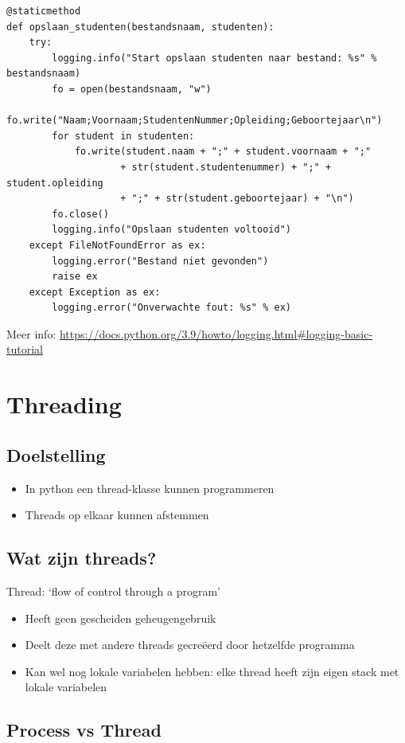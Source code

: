 \documentclass{article}
\begin{document}
\begin{verbatim}
@staticmethod
def opslaan_studenten(bestandsnaam, studenten):
    try:
        logging.info("Start opslaan studenten naar bestand: %s" % bestandsnaam)
        fo = open(bestandsnaam, "w")
        fo.write("Naam;Voornaam;StudentenNummer;Opleiding;Geboortejaar\n")
        for student in studenten:
            fo.write(student.naam + ";" + student.voornaam + ";" 
                    + str(student.studentenummer) + ";" + student.opleiding 
                    + ";" + str(student.geboortejaar) + "\n")
        fo.close()
        logging.info("Opslaan studenten voltooid")
    except FileNotFoundError as ex:
        logging.error("Bestand niet gevonden")
        raise ex
    except Exception as ex:
        logging.error("Onverwachte fout: %s" % ex)
\end{verbatim}


Meer info: \url{https://docs.python.org/3.9/howto/logging.html#logging-basic-tutorial}

\section{Threading}

\subsection{Doelstelling}

\begin{itemize}
    \item In python een thread-klasse kunnen programmeren
    \item Threads op elkaar kunnen afstemmen
\end{itemize}

\subsection{Wat zijn threads?}

Thread: `flow of control through a program'
\begin{itemize}
    \item Heeft geen gescheiden geheugengebruik
    \item Deelt deze met andere threads gecreëerd door hetzelfde programma
    \item Kan wel nog lokale variabelen hebben: elke thread heeft zijn eigen stack met lokale variabelen
\end{itemize}

\subsection{Process vs Thread}
\end{document}
